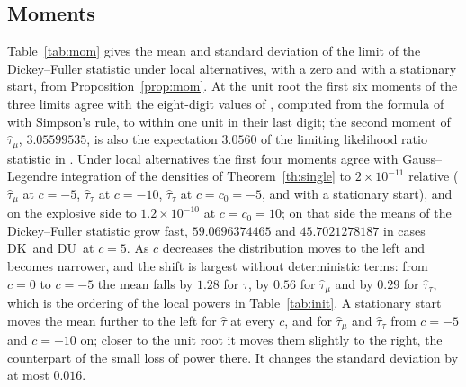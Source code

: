 \documentclass[ecta,nameyear,final]{econsocart}
\newcommand{\Fk}{\textsf{\upshape DK}}
\newcommand{\Fu}{\textsf{\upshape DU}}
\theoremstyle{plain}
\theoremstyle{definition}
\begin{document}
\subsection{Moments}
\label{sec:momnum}

Table~\ref{tab:mom} gives the mean and standard deviation of the limit of the Dickey--Fuller statistic under local alternatives, with a zero and with a stationary start, from Proposition~\ref{prop:mom}.  At the unit root the first six moments of the three limits agree with the eight-digit values of \cite{Nabeya1999}, computed from the formula of \cite{Sawa1978} with Simpson's rule, to within one unit in their last digit; the second moment of $\hat\tau_\mu$, $3.05599535$, is also the expectation $3.0560$ of the limiting likelihood ratio statistic in \cite{Larsson1997}.  Under local alternatives the first four moments agree with Gauss--Legendre integration of the densities of Theorem~\ref{th:single} to $2\times10^{-11}$ relative ($\hat\tau_\mu$ at $c=-5$, $\hat\tau_\tau$ at $c=-10$, $\hat\tau_\tau$ at $c=c_0=-5$, and with a stationary start), and on the explosive side to $1.2\times10^{-10}$ at $c=c_0=10$; on that side the means of the Dickey--Fuller statistic grow fast, $59.0696374465$ and $45.7021278187$ in cases \Fk\ and \Fu\ at $c=5$.  As $c$ decreases the distribution moves to the left and becomes narrower, and the shift is largest without deterministic terms: from $c=0$ to $c=-5$ the mean falls by $1.28$ for $\hat\tau$, by $0.56$ for $\hat\tau_\mu$ and by $0.29$ for $\hat\tau_\tau$, which is the ordering of the local powers in Table~\ref{tab:init}.  A stationary start moves the mean further to the left for $\hat\tau$ at every $c$, and for $\hat\tau_\mu$ and $\hat\tau_\tau$ from $c=-5$ and $c=-10$ on; closer to the unit root it moves them slightly to the right, the counterpart of the small loss of power there.  It changes the standard deviation by at most $0.016$.
\end{document}
